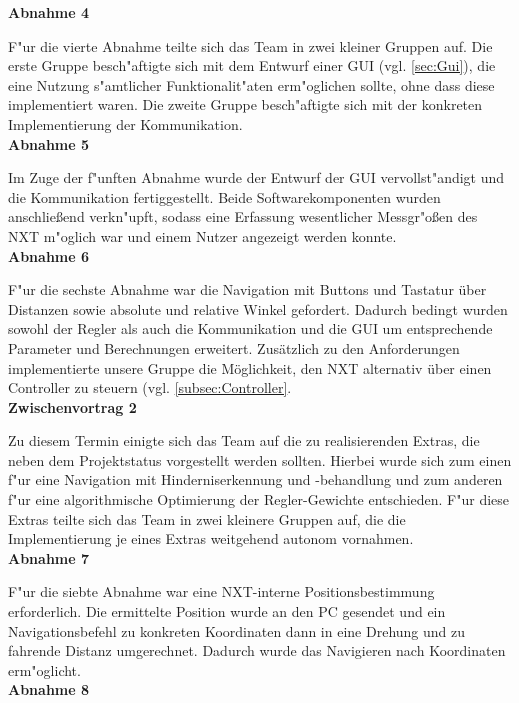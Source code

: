\documentclass[oneside,abstractoff,a4paper]{scrartcl}
\begin{document}
\noindent\textbf{Abnahme 4}
    
F"ur die vierte Abnahme teilte sich das Team in zwei kleiner Gruppen auf. Die erste Gruppe besch"aftigte sich mit dem Entwurf einer GUI (vgl. \cref{sec:Gui}), die eine Nutzung s"amtlicher Funktionalit"aten erm"oglichen sollte, ohne dass diese implementiert waren. Die zweite Gruppe besch"aftigte sich mit der konkreten Implementierung der Kommunikation.\\

\noindent\textbf{Abnahme 5}
     
Im Zuge der f"unften Abnahme wurde der Entwurf der GUI vervollst"andigt und die Kommunikation fertiggestellt. Beide Softwarekomponenten wurden anschließend verkn"upft, sodass eine Erfassung wesentlicher Messgr"oßen des NXT m"oglich war und einem Nutzer angezeigt werden konnte.\\

\noindent\textbf{Abnahme 6}
     
F"ur die sechste Abnahme war die Navigation mit Buttons und Tastatur über Distanzen sowie absolute und relative Winkel gefordert. Dadurch bedingt wurden sowohl der Regler als auch die Kommunikation und die GUI um entsprechende Parameter und Berechnungen erweitert. Zusätzlich zu den Anforderungen implementierte unsere Gruppe die Möglichkeit, den NXT alternativ über einen Controller zu steuern (vgl. \cref{subsec:Controller}.\\

\noindent\textbf{Zwischenvortrag 2}
     
Zu diesem Termin einigte sich das Team auf die zu realisierenden Extras, die neben dem Projektstatus vorgestellt werden sollten. Hierbei wurde sich zum einen f"ur eine Navigation mit Hinderniserkennung und -behandlung und zum anderen f"ur eine algorithmische Optimierung der Regler-Gewichte entschieden. F"ur diese Extras teilte sich das Team in zwei kleinere Gruppen auf, die die Implementierung je eines Extras weitgehend autonom vornahmen.\\

\noindent\textbf{Abnahme 7}
    
F"ur die siebte Abnahme war eine NXT-interne Positionsbestimmung erforderlich. Die ermittelte Position wurde an den PC gesendet und ein Navigationsbefehl zu konkreten Koordinaten dann in eine Drehung und zu fahrende Distanz umgerechnet. Dadurch wurde das Navigieren nach Koordinaten erm"oglicht.\\

\noindent\textbf{Abnahme 8}
     
\end{document}
